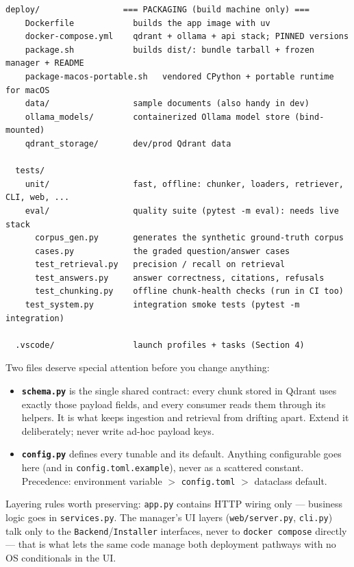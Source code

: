 \documentclass[11pt,letterpaper]{article}
\begin{document}
\begin{lstlisting}[style=tree]
  deploy/                 === PACKAGING (build machine only) ===
    Dockerfile            builds the app image with uv
    docker-compose.yml    qdrant + ollama + api stack; PINNED versions
    package.sh            builds dist/: bundle tarball + frozen manager + README
    package-macos-portable.sh   vendored CPython + portable runtime for macOS
    data/                 sample documents (also handy in dev)
    ollama_models/        containerized Ollama model store (bind-mounted)
    qdrant_storage/       dev/prod Qdrant data

  tests/
    unit/                 fast, offline: chunker, loaders, retriever, CLI, web, ...
    eval/                 quality suite (pytest -m eval): needs live stack
      corpus_gen.py       generates the synthetic ground-truth corpus
      cases.py            the graded question/answer cases
      test_retrieval.py   precision / recall on retrieval
      test_answers.py     answer correctness, citations, refusals
      test_chunking.py    offline chunk-health checks (run in CI too)
    test_system.py        integration smoke tests (pytest -m integration)

  .vscode/                launch profiles + tasks (Section 4)
\end{lstlisting}

Two files deserve special attention before you change anything:

\begin{itemize}
  \item \textbf{\texttt{schema.py}} is the single shared contract: every
        chunk stored in Qdrant uses exactly those payload fields, and every
        consumer reads them through its helpers. It is what keeps ingestion
        and retrieval from drifting apart. Extend it deliberately; never
        write ad-hoc payload keys.
  \item \textbf{\texttt{config.py}} defines every tunable and its default.
        Anything configurable goes here (and in
        \texttt{config.toml.example}), never as a scattered constant.
        Precedence: environment variable $>$ \texttt{config.toml} $>$
        dataclass default.
\end{itemize}

Layering rules worth preserving: \texttt{app.py} contains HTTP wiring only
--- business logic goes in \texttt{services.py}. The manager's UI layers
(\texttt{web/server.py}, \texttt{cli.py}) talk only to the
\texttt{Backend}/\texttt{Installer} interfaces, never to \texttt{docker
compose} directly --- that is what lets the same code manage both
deployment pathways with no OS conditionals in the UI.
\end{document}
